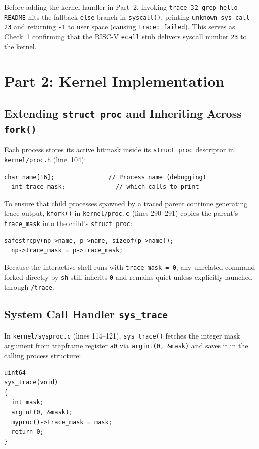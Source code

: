 \documentclass[12pt,a4paper]{article}
\begin{document}
Before adding the kernel handler in Part~2, invoking \texttt{trace 32 grep hello README} hits the fallback \texttt{else} branch in \texttt{syscall()}, printing \texttt{unknown sys call 23} and returning \texttt{-1} to user space (causing \texttt{trace: failed}). This serves as Check~1 confirming that the RISC-V \texttt{ecall} stub delivers syscall number \texttt{23} to the kernel.

\section{Part 2: Kernel Implementation}

\subsection{Extending \texttt{struct proc} and Inheriting Across \texttt{fork()}}
Each process stores its active bitmask inside its \texttt{struct proc} descriptor in \texttt{kernel/proc.h} (line~104):
\begin{lstlisting}[style=cstyle]
  char name[16];               // Process name (debugging)
  int trace_mask;              // which calls to print
\end{lstlisting}

To ensure that child processes spawned by a traced parent continue generating trace output, \texttt{kfork()} in \texttt{kernel/proc.c} (lines 290--291) copies the parent's \texttt{trace\_mask} into the child's \texttt{struct proc}:
\begin{lstlisting}[style=cstyle]
  safestrcpy(np->name, p->name, sizeof(p->name));
  np->trace_mask = p->trace_mask;
\end{lstlisting}
Because the interactive shell runs with \texttt{trace\_mask = 0}, any unrelated command forked directly by \texttt{sh} still inherits \texttt{0} and remains quiet unless explicitly launched through \texttt{/trace}.

\subsection{System Call Handler \texttt{sys\_trace}}
In \texttt{kernel/sysproc.c} (lines 114--121), \texttt{sys\_trace()} fetches the integer mask argument from trapframe register \texttt{a0} via \texttt{argint(0, \&mask)} and saves it in the calling process structure:
\begin{lstlisting}[style=cstyle,caption={Kernel handler \texttt{sys\_trace} in \texttt{kernel/sysproc.c}}]
uint64
sys_trace(void)
{
  int mask;
  argint(0, &mask);
  myproc()->trace_mask = mask;
  return 0;
}
\end{lstlisting}
\end{document}
